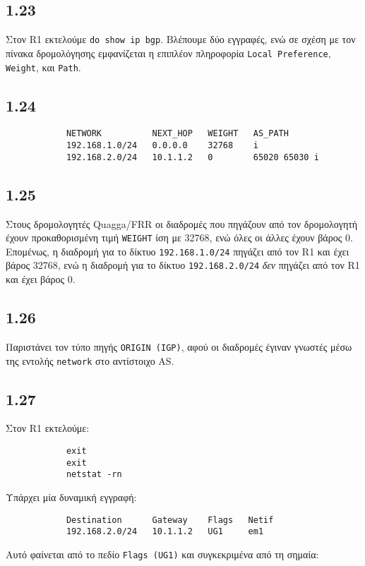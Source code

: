 \documentclass[a4paper, 12pt]{article}
\begin{document}
	\subsection*{1.23}
		Στον R1 εκτελούμε \verb|do show ip bgp|. Βλέπουμε δύο εγγραφές, ενώ σε σχέση με τον πίνακα δρομολόγησης εμφανίζεται η επιπλέον πληροφορία \verb|Local Preference|, \verb|Weight|, και \verb|Path|. 

	\subsection*{1.24}
		\begin{verbatim}
			NETWORK          NEXT_HOP   WEIGHT   AS_PATH
			192.168.1.0/24   0.0.0.0    32768    i
			192.168.2.0/24   10.1.1.2   0        65020 65030 i
		\end{verbatim}

	\subsection*{1.25}
		Στους δρομολογητές Quagga/FRR οι διαδρομές που πηγάζουν από τον δρομολογητή έχουν προκαθορισμένη τιμή \verb|WEIGHT| ίση με 32768, ενώ όλες οι άλλες έχουν βάρος 0. Επομένως, η διαδρομή για το δίκτυο \verb|192.168.1.0/24| πηγάζει από τον R1 και έχει βάρος 32768, ενώ η διαδρομή για το δίκτυο \verb|192.168.2.0/24| \emph{δεν} πηγάζει από τον R1 και έχει βάρος 0.

	\subsection*{1.26}
		Παριστάνει τον τύπο πηγής \verb|ORIGIN (IGP)|, αφού οι διαδρομές έγιναν γνωστές μέσω της εντολής \verb|network| στο αντίστοιχο AS.

	\subsection*{1.27}
		Στον R1 εκτελούμε:
		
		\begin{verbatim}
			exit 
			exit 
			netstat -rn
		\end{verbatim}
		
		Υπάρχει μία δυναμική εγγραφή:
		
		\begin{verbatim}
			Destination      Gateway    Flags   Netif
			192.168.2.0/24   10.1.1.2   UG1     em1
		\end{verbatim}
		
		Αυτό φαίνεται από το πεδίο \verb|Flags (UG1)| και συγκεκριμένα από τη σημαία:
		
\end{document}
